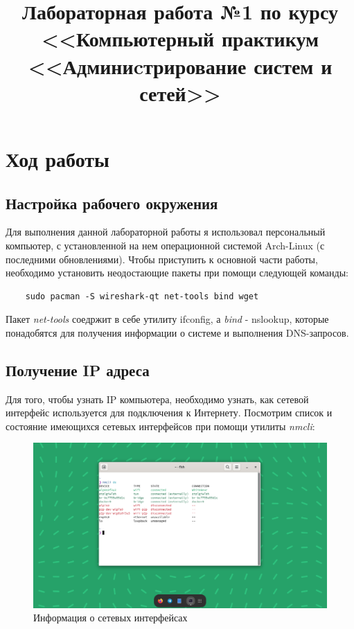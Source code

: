 \documentclass[a4paper]{article}
\title{
  Лабораторная работа №1 по курсу \\
  <<Компьютерный практикум <<Админиcтрирование систем и сетей>>  
}
\begin{document}
  \templatedtitlepage
  
  \toc
  \section{Ход работы}

  \subsection{Настройка рабочего окружения}

  Для выполнения данной лабораторной работы я использовал персональный компьютер,
  с установленной на нем операционной системой Arch-Linux (с последними обновлениями).
  Чтобы приступить к основной части работы, необходимо установить неодостающие пакеты при 
  помощи следующей команды:

  \begin{verbatim}
    sudo pacman -S wireshark-qt net-tools bind wget
  \end{verbatim}

  Пакет \textit{net-tools} соедржит в себе утилиту ifconfig, а \textit{bind} - nslookup, которые
  понадобятся для получения информации о системе и выполнения DNS-запросов.

  \subsection{Получение IP адреса}

  Для того, чтобы узнать IP компьютера, необходимо узнать, как сетевой интерфейс используется
  для подключения к Интернету. Посмотрим список и состояние имеющихся сетевых интерфейсов при 
  помощи утилиты \textit{nmcli}:

  \begin{figure}[H]
    \centering
    \includegraphics[width=1.0\textwidth]{01_0001}
    \caption{Информация о сетевых интерфейсах}
    \label{img:0001}
  \end{figure}
\end{document}
